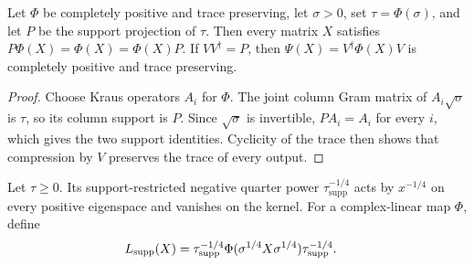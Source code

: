 \begin{theorem}
    \label{thm:channel_output_support_from_faithful_input}
    \leanok
    Let $\Phi$ be completely positive and trace preserving, let $\sigma>0$,
    set $\tau=\Phi(\sigma)$, and let $P$ be the support projection of $\tau$.
    Then every matrix $X$ satisfies
    $P\Phi(X)=\Phi(X)=\Phi(X)P$.  If $VV^\dagger=P$, then
    $\Psi(X)=V^\dagger\Phi(X)V$ is completely positive and trace preserving.
\end{theorem}

\begin{proof}
    \leanok
    Choose Kraus operators $A_i$ for $\Phi$.  The joint column Gram matrix of
    $A_i\sqrt\sigma$ is $\tau$, so its column support is $P$.  Since
    $\sqrt\sigma$ is invertible, $PA_i=A_i$ for every $i$, which gives the
    two support identities.  Cyclicity of the trace then shows that compression
    by $V$ preserves the trace of every output.
\end{proof}

\begin{definition}
    \label{def:supported_weighted_hilbert_schmidt_map}
    \leanok
    Let $\tau\geq 0$.  Its support-restricted negative quarter power
    $\tau^{-1/4}_{\operatorname{supp}}$ acts by $x^{-1/4}$ on every positive
    eigenspace and vanishes on the kernel.  For a complex-linear map $\Phi$,
    define
    \begin{align}
        L_{\operatorname{supp}}(X)
        &=\tau^{-1/4}_{\operatorname{supp}}
          \Phi(\sigma^{1/4}X\sigma^{1/4})
          \tau^{-1/4}_{\operatorname{supp}}.
        \notag
    \end{align}
\end{definition}

